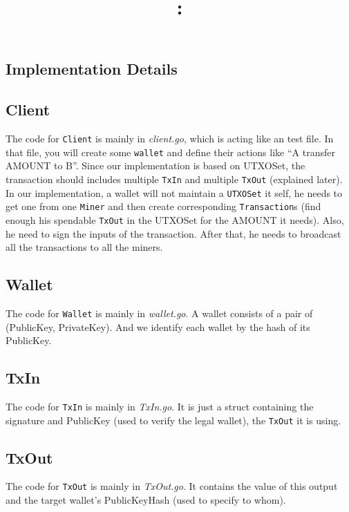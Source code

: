 \documentclass{article}
\title{\textmd{\bf \Class: \Title}\\ \normalsize\vspace{0.1in}}
\date{}
\begin{document}
	\begin{spacing}{1.0}
		\maketitle \thispagestyle{empty}

		\section{Implementation Details}
		\subsection{Client}
		The code for \texttt{Client} is mainly in \textit{client.go}, which is acting like an test file. In that file, you will create some \texttt{wallet} and define their actions like ``A transfer AMOUNT to B''.
		Since our implementation is based on UTXOSet, the transaction should includes multiple \texttt{TxIn} and multiple \texttt{TxOut} (explained later). In our implementation, a wallet will not maintain a 
		\texttt{UTXOSet} it self, he needs to get one from one \texttt{Miner} and then create corresponding \texttt{Transaction}s (find enough his spendable \texttt{TxOut} in the UTXOSet for the AMOUNT it needs). Also, 
		he need to sign the inputs of the transaction. After that, he needs to broadcast all the transactions to all the miners.

		\subsection{Wallet}
		The code for \texttt{Wallet} is mainly in \textit{wallet.go}. A wallet consists of a pair of (PublicKey, PrivateKey). And we identify each wallet by the hash of its PublicKey.

		\subsection{TxIn}
		The code for \texttt{TxIn} is mainly in \textit{TxIn.go}. It is just a struct containing the signature and PublicKey (used to verify the legal wallet), the \texttt{TxOut} it is using.

		\subsection{TxOut}
		The code for \texttt{TxOut} is mainly in \textit{TxOut.go}. It contains the value of this output and the target wallet's PublicKeyHash (used to specify to whom).


\end{spacing}
\end{document}
